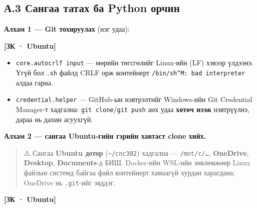 \hypertarget{ux430.3-ux441ux430ux43dux433ux430ux430-ux442ux430ux442ux430ux445-ux431ux430-python-ux43eux440ux447ux438ux43d}{%
\subsection{А.3 Сангаа татах ба Python орчин}\label{ux430.3-ux441ux430ux43dux433ux430ux430-ux442ux430ux442ux430ux445-ux431ux430-python-ux43eux440ux447ux438ux43d}}

\textbf{Алхам 1 --- Git тохируулах} (нэг удаа):

\textbf{{[}ЗК · Ubuntu{]}}

\begin{Shaded}
\begin{Highlighting}[]
\end{Highlighting}
\end{Shaded}

\begin{itemize}
\tightlist
\item
  \texttt{core.\allowbreak{}autocrlf\ input} --- мөрийн төгсгөлийг Linux-ийн (LF) хэвээр үлдээнэ. Үгүй бол \texttt{.sh} файлд CRLF орж контейнерт \texttt{/bin/sh\^{}M:\ bad\ interpreter} алдаа гарна.
\item
  \texttt{credential.\allowbreak{}helper} --- GitHub-ын нэвтрэлтийг Windows-ийн Git Credential Manager-т хадгална: \texttt{git\ clone}/\allowbreak\texttt{git\ push} анх удаа \textbf{хөтөч нээж} нэвтрүүлнэ, дараа нь дахин асуухгүй.
\end{itemize}

\textbf{Алхам 2 --- сангаа Ubuntu-гийн гэрийн хавтаст clone хийх.}

\begin{quote}
⚠ Сангаа \textbf{Ubuntu дотор} (\texttt{\textasciitilde{}/cnc302}) хадгална --- \texttt{/mnt/c/\ldots{}}, \textbf{OneDrive}, \textbf{Desktop}, \textbf{Documents}-д БИШ. Docker-ийн WSL-ийн зөвлөмжөөр Linux файлын системд байгаа файл контейнерт хамаагүй хурдан харагдана; OneDrive нь \texttt{.git}-ийг эвддэг.
\end{quote}

\textbf{{[}ЗК · Ubuntu{]}}

